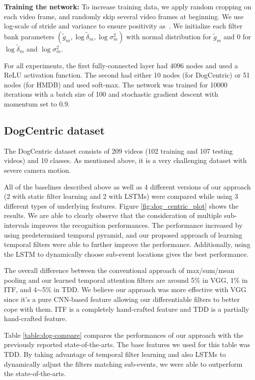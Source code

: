 \documentclass[letterpaper]{article}
\begin{document}
{\flushleft\textbf{Training the network:} To increase training data, we apply random cropping on each video frame, and randomly skip several video frames at beginning.  We use log-scale of stride and variance to ensure positivity as~\cite{attention15}.
We initialize each filter bank parameters $(\widetilde{g}_m, \log\widetilde{\delta}_m, \log\sigma_m^2)$ with normal distribution for $\widetilde{g}_m$  and 0 for $\log\widetilde{\delta}_m$ and $\log\sigma_m^2$.}

For all experiments, the first fully-connected layer had 4096 nodes and used a ReLU activation function. The second had either 10 nodes (for DogCentric) or 51 nodes (for HMDB) and used soft-max. The network was trained for 10000 iterations with a batch size of 100 and stochastic gradient descent with momentum set to 0.9. 

\subsection{DogCentric dataset}
The DogCentric dataset consists of 209 videos (102 training and 107 testing videos) and 10 classes. As mentioned above, it is a very challenging dataset with severe camera motion.

All of the baselines described above as well as 4 different versions of our approach (2 with static filter learning and 2 with LSTMs) were compared while using 3 different types of underlying features. Figure \ref{fig:dog_centric_plot} shows the results. We are able to clearly observe that the consideration of multiple sub-intervals improves the recognition performances. The performance increased by using predetermined temporal pyramid, and our proposed approach of learning temporal filters were able to further improve the performance. Additionally, using the LSTM to dynamically choose sub-event locations gives the best performance.

The overall difference between the conventional approach of max/sum/mean pooling and our learned temporal attention filters are around 5\% in VGG, 1\% in ITF, and 4$\sim$5\% in TDD. We believe our approach was more effective with VGG since it's a pure CNN-based feature allowing our differentiable filters to better cope with them. ITF is a completely hand-crafted feature and TDD is a partially hand-crafted feature.

Table \ref{table:dog-compare} compares the performances of our approach with the previously reported state-of-the-arts. The base features we used for this table was TDD. By taking advantage of temporal filter learning and also LSTMs to dynamically adjust the filters matching sub-events, we were able to outperform the state-of-the-arts.
\end{document}

